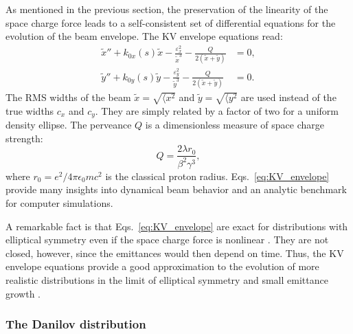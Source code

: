 As mentioned in the previous section, the preservation of the linearity of the space charge force leads to a self-consistent set of differential equations for the evolution of the beam envelope. The KV envelope equations read:
%
\begin{align} \label{eq:KV_envelope}
    \tilde{x}'' + k_{0x}(s)\tilde{x} - \frac{\varepsilon_x^2}{\tilde{x}^3} - \frac{Q}{2\left(\tilde{x} + \tilde{y}\right)} &= 0, \\
    \tilde{y}'' + k_{0y}(s)\tilde{y} - \frac{\varepsilon_y^2}{\tilde{y}^3} - \frac{Q}{2\left(\tilde{x} + \tilde{y}\right)} &= 0. \nonumber
\end{align}
%
The RMS widths of the beam $\tilde{x} = \sqrt{\langle{{x^2}}}$ and $\tilde{y} = \sqrt{\langle{{y^2}}}$ are used instead of the true widths $c_x$ and $c_y$. They are simply related by a factor of two for a uniform density ellipse. The perveance $Q$ is a dimensionless measure of space charge strength:
%
\begin{equation}\label{eq:perveance}
    Q = \frac{2\lambda r_0}{\beta^2\gamma^3},
\end{equation}
%
where $r_0 = e^2 / 4\pi\epsilon_0mc^2$ is the classical proton radius. Eqs.~\eqref{eq:KV_envelope} provide many insights into dynamical beam behavior and an analytic benchmark for computer simulations.  

A remarkable fact is that Eqs.~\eqref{eq:KV_envelope} are exact for distributions with elliptical symmetry even if the space charge force is nonlinear \cite{Sacherer1968}. They are not closed, however, since the emittances would then depend on time. Thus, the KV envelope equations provide a good approximation to the evolution of more realistic distributions in the limit of elliptical symmetry and small emittance growth \cite{Lund2004}.


\subsubsection{The Danilov distribution}

